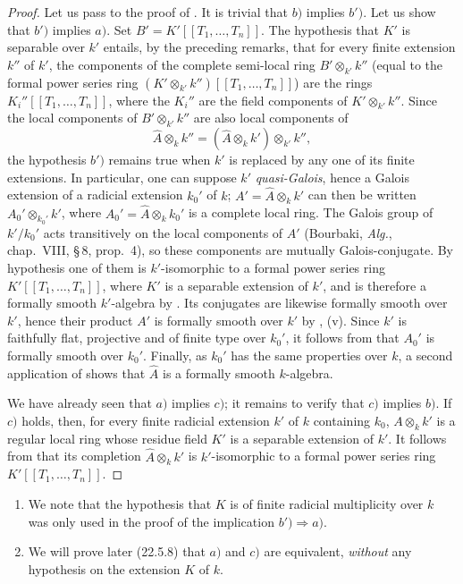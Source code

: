 \begin{proof}
Let us pass to the proof of .
It is trivial that $b)$ implies $b')$.
Let us show that $b')$ implies $a)$.
Set $B'=K'[[T_1,\ldots,T_n]]$.
The hypothesis that $K'$ is separable over $k'$ entails, by the preceding remarks, that for every finite extension $k''$ of $k'$, the components of the complete semi-local ring
$B'\otimes_{k'}k''$ (equal to the formal power series ring
$(K'\otimes_{k'}k'')[[T_1,\ldots,T_n]]$) are the rings
$K_i''[[T_1,\ldots,T_n]]$, where the $K_i''$ are the field components of
$K'\otimes_{k'}k''$.
Since the local components of $B'\otimes_{k'}k''$ are also local components of
\[
  \widehat{A}\otimes_k k''
  =(\widehat{A}\otimes_k k')\otimes_{k'}k'',
\]
the hypothesis $b')$ remains true when $k'$ is replaced by any one of its finite extensions.
In particular, one can suppose $k'$ \emph{quasi-Galois}, hence a Galois extension of a radicial extension $k_0'$ of $k$;
$A'=\widehat{A}\otimes_k k'$ can then be written
$A_0'\otimes_{k_0'}k'$, where $A_0'=\widehat{A}\otimes_k k_0'$ is a complete local ring.
The Galois group of $k'/k_0'$ acts transitively on the local components of $A'$
(Bourbaki, \emph{Alg.}, chap.~VIII, \S\,8, prop.~4), so these components are
mutually Galois-conjugate. By hypothesis one of them is $k'$-isomorphic to a
formal power series ring $K'[[T_1,\ldots,T_n]]$, where $K'$ is a separable
extension of $k'$, and is therefore a formally smooth $k'$-algebra by
. Its conjugates are likewise formally smooth over $k'$, hence
their product $A'$ is formally smooth over $k'$ by , (v). Since
$k'$ is faithfully flat, projective and of finite type over $k_0'$, it follows
from  that $A_0'$ is formally smooth over $k_0'$. Finally, as
$k_0'$ has the same properties over $k$, a second application of
 shows that $\widehat{A}$ is a formally smooth $k$-algebra.

We have already seen  that $a)$ implies $c)$; it remains to verify that $c)$ implies $b)$.
If $c)$ holds, then, for every finite radicial extension $k'$ of $k$ containing $k_0$, $A\otimes_k k'$ is a regular local ring whose residue field $K'$ is a separable extension of $k'$.
It follows from  that its completion
$\widehat{A}\otimes_k k'$ is $k'$-isomorphic to a formal power series ring
$K'[[T_1,\ldots,T_n]]$.
\end{proof}

\begin{remarks}[19.6.7]
\label{0.19.6.7}
\begin{enumerate}
  \item[\rm(i)] We note that the hypothesis that $K$ is of finite radicial multiplicity over $k$ was only used in the proof of the implication $b')\Rightarrow a)$.
  \item[\rm(ii)] We will prove later (22.5.8) that $a)$ and $c)$ are equivalent, \emph{without} any hypothesis on the extension $K$ of $k$.
\end{enumerate}
\end{remarks}

